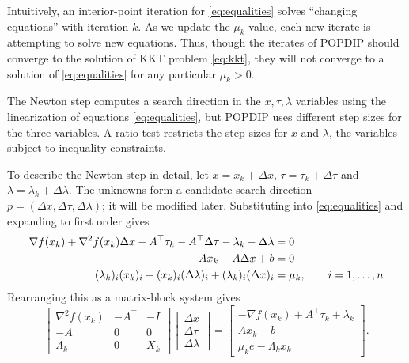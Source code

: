 \documentclass[11pt]{article}
\newcommand{\grad}{\nabla}
\begin{document}
Intuitively, an interior-point iteration for \eqref{eq:equalities} solves ``changing equations'' with iteration $k$.  As we update the $\mu_k$ value, each new iterate is attempting to solve new equations.  Thus, though the iterates of POPDIP should converge to the solution of KKT problem \eqref{eq:kkt}, they will not converge to a solution of \eqref{eq:equalities} for any particular $\mu_k>0$.

The Newton step computes a search direction in the $x,\tau,\lambda$ variables using the linearization of equations \eqref{eq:equalities}, but POPDIP uses different step sizes for the three variables.  A ratio test \cite[section 3.1]{GrivaNashSofer2009} restricts the step sizes for $x$ and $\lambda$, the variables subject to inequality constraints.

To describe the Newton step in detail, let $x=x_k+\Delta x$, $\tau=\tau_k+\Delta\tau$ and $\lambda=\lambda_k+\Delta\lambda$.  The unknowns form a candidate search direction $p=(\Delta x,\Delta\tau,\Delta\lambda)$; it will be modified later.  Substituting into \eqref{eq:equalities} and expanding to first order gives
\begin{align}
\grad f(x_k) + \grad^2 f(x_k) \Delta x - A^\top \tau_k - A^\top \Delta \tau - \lambda_k - \Delta \lambda &= 0 \label{eq:prenewtonstep} \\
-A x_k - A \Delta x + b &= 0 \notag \\
(\lambda_k)_i (x_k)_i + (x_k)_i (\Delta\lambda)_i + (\lambda_k)_i (\Delta x)_i &= \mu_k, \qquad i=1,\dots,n \notag
\end{align}
Rearranging this as a matrix-block system gives
\begin{equation}
\begin{bmatrix}
\grad^2 f(x_k) & -A^\top & -I \\
-A             & 0       & 0  \\
\Lambda_k      & 0       & X_k
\end{bmatrix}
\begin{bmatrix}
\Delta x \\
\Delta \tau \\
\Delta \lambda
\end{bmatrix}
=
\begin{bmatrix}
-\grad f(x_k) + A^\top \tau_k + \lambda_k \\
A x_k - b \\
\mu_k e - \Lambda_k x_k
\end{bmatrix}. \label{eq:unreducednewtonstep}
\end{equation}
\end{document}
